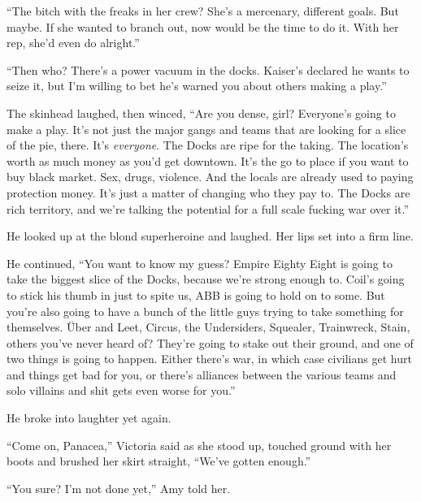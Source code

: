 ``The bitch with the freaks in her crew?  She's a mercenary, different goals.  But maybe.  If she wanted to branch out, now would be the time to do it.  With her rep, she'd even do alright.''



``Then who?  There's a power vacuum in the docks.  Kaiser's declared he wants to seize it, but I'm willing to bet he's warned you about others making a play.''



The skinhead laughed, then winced, ``Are you dense, girl?  Everyone's going to make a play.  It's not just the major gangs and teams that are looking for a slice of the pie, there.  It's \emph{everyone}.  The Docks are ripe for the taking.  The location's worth as much money as you'd get downtown.  It's the go to place if you want to buy black market.  Sex, drugs, violence.  And the locals are already used to paying protection money.  It's just a matter of changing who they pay to.  The Docks are rich territory, and we're talking the potential for a full scale fucking war over it.''



He looked up at the blond superheroine and laughed.  Her lips set into a firm line.



He continued, ``You want to know my guess?  Empire Eighty Eight is going to take the biggest slice of the Docks, because we're strong enough to.  Coil's going to stick his thumb in just to spite us, ABB is going to hold on to some.  But you're also going to have a bunch of the little guys trying to take something for themselves.  \"{U}ber and Leet, Circus, the Undersiders, Squealer, Trainwreck, Stain, others you've never heard of?  They're going to stake out their ground, and one of two things is going to happen.  Either there's war, in which case civilians get hurt and things get bad for you, or there's alliances between the various teams and solo villains and shit gets even worse for you.''



He broke into laughter yet again.



``Come on, Panacea,'' Victoria said as she stood up, touched ground with her boots and brushed her skirt straight, ``We've gotten enough.''



``You sure?  I'm not done yet,'' Amy told her.



